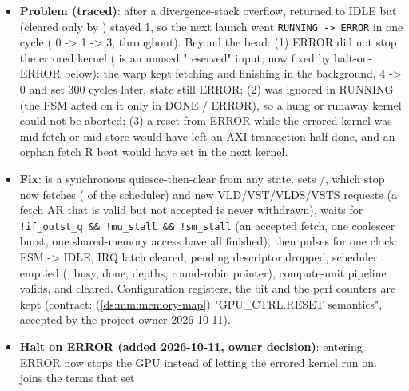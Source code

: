 \begin{record}

\begin{itemize}
\tightlist
\item
  \textbf{Problem (traced)}: after a divergence-stack overflow,
   returned  to IDLE but
   (cleared only by )
  stayed 1, so the next launch went
  \texttt{RUNNING\ -\allowbreak{}>\ ERROR} in one cycle (
  0 -\textgreater{} 1 -\textgreater{} 3,  throughout).
  Beyond the bead: (1) ERROR did not stop the errored kernel
  ( is an unused "reserved" input; now
  fixed by halt-on-ERROR below): the warp kept fetching and finishing in
  the background,  4 -\textgreater{} 0 and
   set 300 cycles later, state still ERROR; (2)
   was ignored in RUNNING (the FSM acted on it only
  in DONE / ERROR), so a hung or runaway kernel could not be aborted;
  (3) a reset from ERROR while the errored kernel was mid-fetch or
  mid-store would have left an AXI transaction half-done, and an orphan
  fetch R beat would have set  in the next kernel.
\item
  \textbf{Fix}:  is a synchronous
  quiesce-then-clear from any state.  sets
  /, which stop new fetches
  ( of the scheduler) and new
  VLD/\allowbreak{}VST/\allowbreak{}VLDS/\allowbreak{}VSTS requests (a
  fetch AR that is valid but not accepted is never withdrawn), waits for
  \texttt{!if\_\allowbreak{}outst\_\allowbreak{}q\ \&\&\ !mu\_\allowbreak{}stall\ \&\&\ !sm\_\allowbreak{}stall}
  (an accepted fetch, one coalescer burst, one shared-memory access have
  all finished), then pulses  for one clock: FSM
  -\textgreater{} IDLE, IRQ latch cleared, pending descriptor dropped,
  scheduler emptied (, busy, done, depths, round-robin
  pointer), compute-unit pipeline valids,  and
   cleared. Configuration registers, the 
  bit and the perf counters are kept (contract:  (\cref{ds:mm:memory-map})
  "GPU\_\allowbreak{}CTRL.RESET semantics", accepted by the project
  owner 2026-10-11).
\item
  \textbf{Halt on ERROR (added 2026-10-11, owner decision)}: entering
  ERROR now stops the GPU instead of letting the errored kernel run on.
   joins the  terms that set

\end{itemize}
\end{record}
